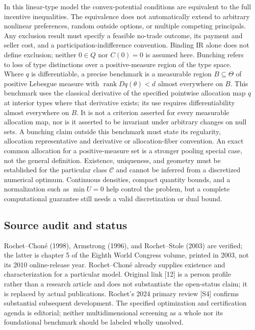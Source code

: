 \documentclass[11pt,a4paper]{article}
\begin{document}
In this linear-type model the convex-potential conditions are equivalent to the full incentive inequalities. The equivalence does not automatically extend to arbitrary nonlinear preferences, random outside options, or multiple competing principals. Any exclusion result must specify a feasible no-trade outcome, its payment and seller cost, and a participation-indifference convention. Binding IR alone does not define exclusion; neither $0\in Q$ nor $C(0)=0$ is assumed here. Bunching refers to loss of type distinctions over a positive-measure region of the type space. Where $q$ is differentiable, a precise benchmark is a measurable region $B\subseteq\Theta$ of positive Lebesgue measure with $\operatorname{rank}Dq(\theta)<d$ almost everywhere on $B$. This benchmark uses the classical derivative of the specified pointwise allocation map $q$ at interior types where that derivative exists; its use requires differentiability almost everywhere on $B$. It is not a criterion asserted for every measurable allocation map, nor is it asserted to be invariant under arbitrary changes on null sets. A bunching claim outside this benchmark must state its regularity, allocation representative and derivative or allocation-fiber convention. An exact common allocation for a positive-measure set is a stronger pooling special case, not the general definition. Existence, uniqueness, and geometry must be established for the particular class $\mathcal C$ and cannot be inferred from a discretized numerical optimum. Continuous densities, compact quantity bounds, and a normalization such as $\min U=0$ help control the problem, but a complete computational guarantee still needs a valid discretization or dual bound.

\subsection*{Source audit and status}

Rochet--Choné (1998), Armstrong (1996), and Rochet--Stole (2003) are verified; the latter is chapter 5 of the Eighth World Congress volume, printed in 2003, not its 2010 online-release year. Rochet--Choné already supplies existence and characterization for a particular model. Original link [12] is a person profile rather than a research article and does not substantiate the open-status claim; it is replaced by actual publications. Rochet's 2024 primary review [S4] confirms substantial subsequent development. The specified optimization and certification agenda is editorial; neither multidimensional screening as a whole nor its foundational benchmark should be labeled wholly unsolved.
\end{document}

